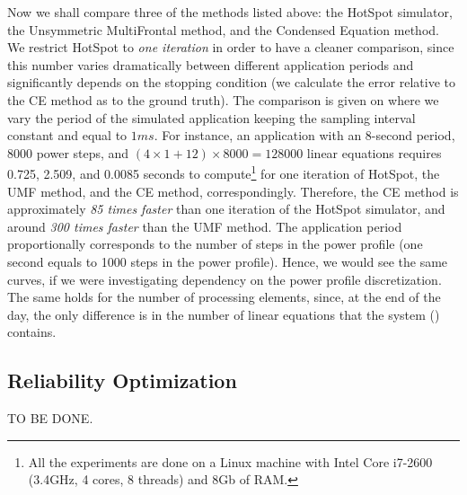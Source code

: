 Now we shall compare three of the methods listed above: the HotSpot simulator, the Unsymmetric MultiFrontal method, and the Condensed Equation method. We restrict HotSpot to \emph{one iteration} in order to have a cleaner comparison, since this number varies dramatically between different application periods and significantly depends on the stopping condition (we calculate the error relative to the CE method as to the ground truth). The comparison is given on  where we vary the period of the simulated application keeping the sampling interval constant and equal to $1 ms$. For instance, an application with an 8-second period, 8000 power steps, and $(4 \times 1 + 12) \times 8000 = 128000$ linear equations requires 0.725, 2.509, and 0.0085 seconds to compute\footnote{All the experiments are done on a Linux machine with Intel Core i7-2600 (3.4GHz, 4 cores, 8 threads) and 8Gb of RAM.} for one iteration of HotSpot, the UMF method, and the CE method, correspondingly. Therefore, the CE method is approximately \emph{85 times faster} than one iteration of the HotSpot simulator, and around \emph{300 times faster} than the UMF method. The application period proportionally corresponds to the number of steps in the power profile (one second equals to 1000 steps in the power profile). Hence, we would see the same curves, if we were investigating dependency on the power profile discretization. The same holds for the number of processing elements, since, at the end of the day, the only difference is in the number of linear equations that the system () contains.

\subsection{Reliability Optimization}
TO BE DONE.
